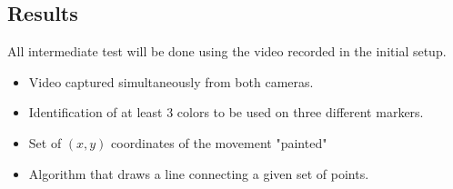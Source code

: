 \documentclass[a4paper,12pt]{article}
\begin{document}
\subsection*{Results}

All intermediate test will be done using the video recorded in the initial setup. 
\begin{itemize}
\item Video captured simultaneously from both cameras. 
\item Identification of at least 3 colors to be used on three different markers.
\item Set of $(x,y)$ coordinates of the movement "painted"
\item Algorithm that draws a line connecting a given set of points.
\end{itemize}
\end{document}
